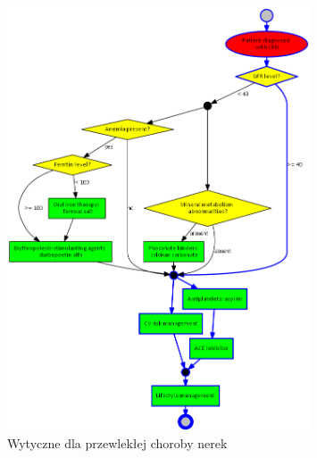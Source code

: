 \begin{figure}[H]
\centering
\includegraphics[width=0.8\textwidth]{img/ckd-simplified-ver-5.png}
\caption{Wytyczne dla przewlekłej choroby nerek}
\label{fig:ckd}
\end{figure}
\newpage
